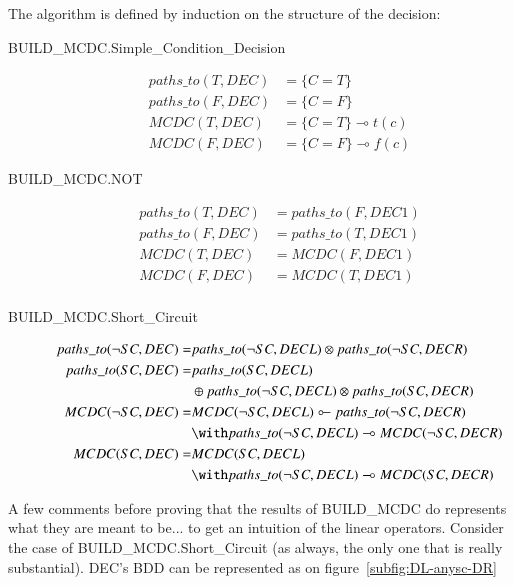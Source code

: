\documentclass[a4paper,12pt,twoside]{article}
\begin{document}
The algorithm is defined by induction on the structure of the decision:

\begin{description}
\item[BUILD\_MCDC.Simple\_Condition\_Decision]
\begin{align*}
    paths\_to(T, DEC) & = \{C=T\}\\
    paths\_to(F, DEC) & = \{C=F\}\\
    MCDC(T, DEC)      & = \{C=T\} \multimap t(c)\\
    MCDC(F, DEC)      & = \{C=F\} \multimap f(c)
\end{align*}

\item[BUILD\_MCDC.NOT]
\begin{align*}
    paths\_to(T, DEC) & = paths\_to(F, DEC1)\\
    paths\_to(F, DEC) & = paths\_to(T, DEC1)\\
    MCDC(T, DEC)      & = MCDC(F, DEC1)\\
    MCDC(F, DEC)      & = MCDC(T, DEC1)\\
\end{align*}

\item[BUILD\_MCDC.Short\_Circuit]
\begin{align*}
    paths\_to(\neg SC, DEC) =
      & paths\_to(\neg SC, DECL)
          \otimes paths\_to(\neg SC, DECR)\\
    paths\_to(SC, DEC) =
      & paths\_to(SC, DECL)\\
      &  \oplus paths\_to(\neg SC, DECL)
                  \otimes paths\_to(SC, DECR)\\
    MCDC(\neg SC, DEC) =
      & MCDC(\neg SC, DECL)
          \multimapinv paths\_to(\neg SC, DECR)\\
      & \with paths\_to(\neg SC, DECL)
          \multimap MCDC(\neg SC, DECR)\\
    MCDC(SC, DEC) =
      & MCDC(SC, DECL) \\
      & \with paths\_to(\neg SC, DECL) \multimap MCDC(SC, DECR)
\end{align*}
\end{description}

A few comments before proving that the results of BUILD\_MCDC do represents
what they are meant to be... to get an intuition of the linear
operators.  Consider the case of BUILD\_MCDC.Short\_Circuit (as always,
the only one that is really substantial). DEC's BDD can be represented
as on figure~\ref{subfig:DL-anysc-DR}
\end{document}
